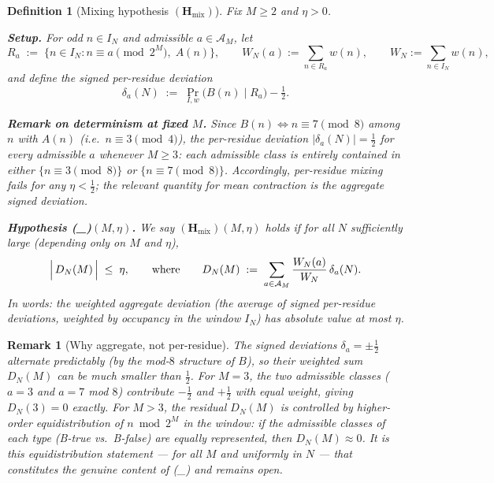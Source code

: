 \documentclass[11pt,a4paper]{article}
\newcommand{\PrIw}{\Pr_{I,w}}                       %
\newcommand{\Hmix}{(\mathbf{H}_{\mathrm{mix}})}     %
\newtheorem{definition}[theorem]{Definition}
\newtheorem{remark}[theorem]{Remark}
\begin{document}
\begin{definition}[Mixing hypothesis $\Hmix$]\label{def:hmix}
Fix $M \ge 2$ and $\eta > 0$.

\textbf{Setup.}  For odd $n \in I_N$ and admissible $a \in \mathcal{A}_M$, let
\[
  R_a \;:=\; \{n \in I_N : n \equiv a \pmod{2^M},\; A(n)\},
  \qquad
  W_N(a) := \sum_{n \in R_a} w(n),
  \qquad
  W_N := \sum_{n \in I_N} w(n),
\]
and define the \emph{signed per-residue deviation}
\[
  \delta_a(N) \;:=\; \PrIw\!\bigl(B(n) \mid R_a\bigr) - \tfrac{1}{2}.
\]

\textbf{Remark on determinism at fixed $M$.}  Since $B(n) \Leftrightarrow
n \equiv 7 \pmod{8}$ among $n$ with $A(n)$ (i.e.\ $n \equiv 3 \pmod 4$),
the per-residue deviation $|\delta_a(N)| = \tfrac{1}{2}$ for every admissible
$a$ whenever $M \ge 3$: each admissible class is entirely contained in either
$\{n \equiv 3 \pmod 8\}$ or $\{n \equiv 7 \pmod 8\}$.  Accordingly,
\emph{per-residue} mixing fails for any $\eta < \tfrac{1}{2}$; the relevant
quantity for mean contraction is the \emph{aggregate} signed deviation.

\textbf{Hypothesis \Hmix{}$(M,\eta)$.}  We say \emph{$\Hmix(M,\eta)$ holds} if
for all $N$ sufficiently large (depending only on $M$ and $\eta$),
\begin{equation}\label{eq:hmix}
  \Bigl|\,D_N(M)\,\Bigr|
  \;\le\; \eta,
  \qquad\text{where}\qquad
  D_N(M)
  \;:=\;
  \sum_{a \in \mathcal{A}_M}
  \frac{W_N(a)}{W_N}\,\delta_a(N).
\end{equation}
In words: the \emph{weighted aggregate deviation} (the average of signed
per-residue deviations, weighted by occupancy in the window $I_N$) has
absolute value at most $\eta$.
\end{definition}

\begin{remark}[Why aggregate, not per-residue]\label{rem:aggregate}
The signed deviations $\delta_a = \pm\tfrac12$ alternate predictably
(by the mod-$8$ structure of $B$), so their weighted sum $D_N(M)$ can be
much smaller than $\tfrac12$.  For $M = 3$, the two admissible classes
($a = 3$ and $a = 7$ mod $8$) contribute $-\tfrac12$ and $+\tfrac12$
with equal weight, giving $D_N(3) = 0$ exactly.  For $M > 3$, the residual
$D_N(M)$ is controlled by \emph{higher-order equidistribution} of $n \bmod 2^M$
in the window: if the admissible classes of each type (B-true vs.\ B-false)
are equally represented, then $D_N(M) \approx 0$.  It is this equidistribution
statement — for all $M$ and uniformly in $N$ — that constitutes the genuine
content of \Hmix{} and remains open.
\end{remark}
\end{document}
